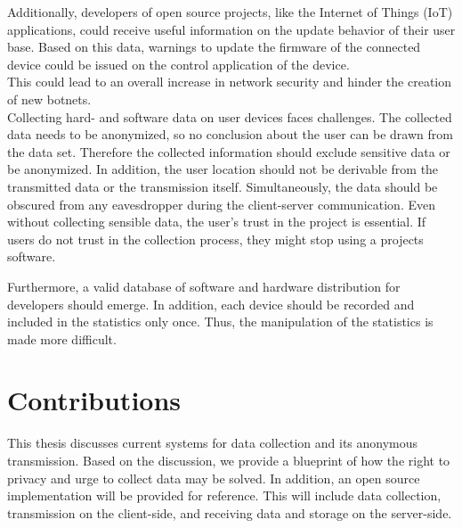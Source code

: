 Additionally, developers of open source projects, like the Internet of Things (IoT) applications, could receive useful
information on the update behavior of their user base. Based on this data, warnings to update the firmware of the
connected device could be issued on the control application of the device.\\
This could lead to an overall increase in network security and hinder the creation of new botnets.\\

Collecting hard- and software data on user devices faces challenges. The collected data needs to be anonymized,
so no conclusion about the user can be drawn from the data set. Therefore the collected information should exclude
sensitive data or be anonymized. 
In addition, the user location should not be derivable from the transmitted data or the transmission itself. Simultaneously, the data should be obscured from any eavesdropper during the client-server communication. Even without collecting sensible data, the user's trust in the project is essential. If users do not trust in the collection process, they might stop using a projects software.

Furthermore, a valid database of software and hardware distribution for developers should emerge. In addition,
each device should be recorded and included in the statistics only once.
Thus, the manipulation of the statistics is made more difficult.



\section{Contributions}
\label{sec:intro:contrib}
%

This thesis discusses current systems for data collection and its anonymous transmission. Based on the discussion, we provide a blueprint of how the right to privacy and urge to collect data may be solved.
In addition, an open source implementation will be provided for reference.
This will include data collection, transmission on the client-side, and receiving data and storage on the server-side.

